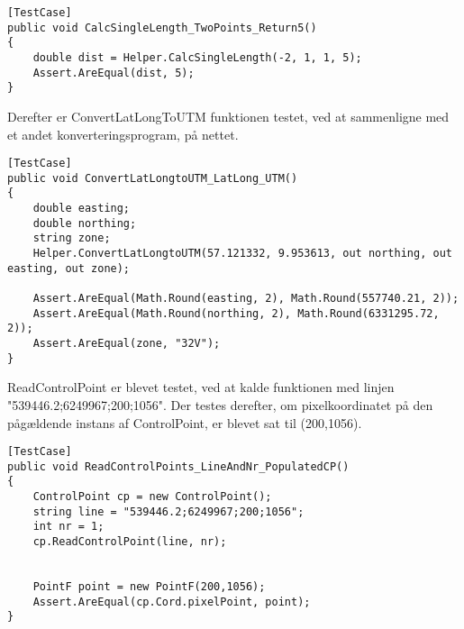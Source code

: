 \begin{lstlisting}
[TestCase]
public void CalcSingleLength_TwoPoints_Return5()
{
    double dist = Helper.CalcSingleLength(-2, 1, 1, 5);
    Assert.AreEqual(dist, 5);
}
\end{lstlisting}

Derefter er ConvertLatLongToUTM funktionen testet, ved at sammenligne med et andet konverteringsprogram, på nettet. \citep{LatLongConvert}  

\begin{lstlisting}
[TestCase]
public void ConvertLatLongtoUTM_LatLong_UTM()
{
    double easting;
    double northing;
    string zone;
    Helper.ConvertLatLongtoUTM(57.121332, 9.953613, out northing, out easting, out zone);

    Assert.AreEqual(Math.Round(easting, 2), Math.Round(557740.21, 2));
    Assert.AreEqual(Math.Round(northing, 2), Math.Round(6331295.72, 2));
    Assert.AreEqual(zone, "32V");
}
\end{lstlisting}

ReadControlPoint er blevet testet, ved at kalde funktionen med linjen "539446.2;6249967;200;1056". Der testes derefter, om pixelkoordinatet på den pågældende instans af ControlPoint, er blevet sat til (200,1056).

\begin{lstlisting}
[TestCase]
public void ReadControlPoints_LineAndNr_PopulatedCP()
{
    ControlPoint cp = new ControlPoint();
    string line = "539446.2;6249967;200;1056";
    int nr = 1;
    cp.ReadControlPoint(line, nr);

            
    PointF point = new PointF(200,1056);
    Assert.AreEqual(cp.Cord.pixelPoint, point);
}
\end{lstlisting}


